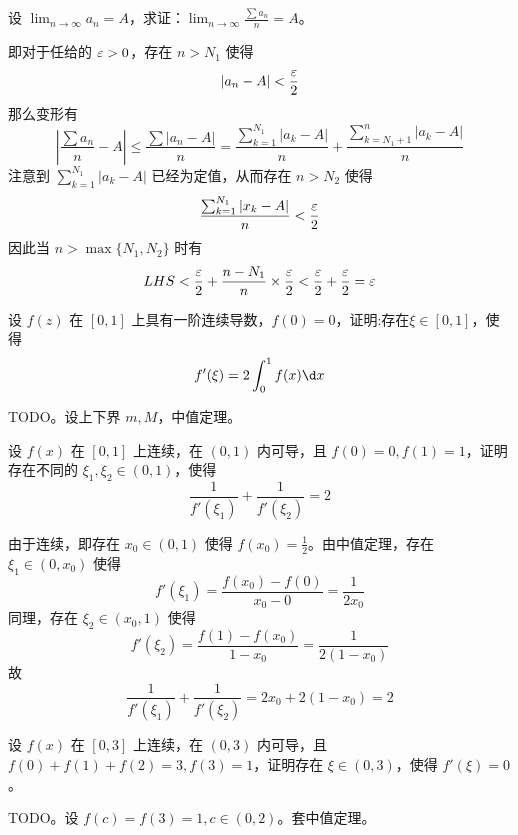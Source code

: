 \begin{problem}[000007]
设 $\displaystyle\lim_{n\to\infty}a_n=A$，求证：$\displaystyle\lim_{n\to\infty}\frac{\sum a_n}{n}=A$。
\end{problem}

\begin{solution}
	即对于任给的 $\varepsilon>0$，存在 $n>N_1$ 使得
	\[ |a_n-A|<\dfrac{\varepsilon}{2}\]
	那么变形有
	\[ \left|\frac{\sum a_n}{n}-A\right| \leqslant \frac{\sum |a_n-A|}{n} = \frac{\sum_{k=1}^{N_1} |a_k-A|}{n} + \frac{\sum_{k=N_1+1}^{n} |a_k-A|}{n}\]
	注意到 $\sum_{k=1}^{N_1} |a_k-A|$ 已经为定值，从而存在 $n>N_2$ 使得
	\[ \frac{\sum_{k=1}^{N_1}|x_k-A|}{n}<\frac{\varepsilon}{2}\]
	因此当 $n>\max\{N_1,N_2\}$ 时有
	\[ LHS < \frac{\varepsilon}{2}+\frac{n-N_1}{n}\times \frac{\varepsilon}{2} < \frac{\varepsilon}{2}+\frac{\varepsilon}{2} = \varepsilon \]
\end{solution}

\begin{problem}[000009]
设 $f(z)$ 在 $[0,1]$ 上具有一阶连续导数，$f(0) = 0$，证明:存在$\xi \in [0,1]$，使得
\[ f'(\xi) = 2\int_0^1f(x) \d x \]
\end{problem}

\begin{solution}
	TODO。设上下界 $m, M$，中值定理。
\end{solution}

\begin{problem}[000010]
设 $f(x)$ 在 $[0, 1]$ 上连续，在 $(0, 1)$ 内可导，且 $f(0) = 0, f(1) = 1$，证明存在不同的 $\xi_1, \xi_2 \in (0, 1)$，使得
\[ \frac{1}{f'(\xi_1)} + \frac{1}{f'(\xi_2)} = 2 \]
\end{problem}

\begin{solution}
	由于连续，即存在 $x_0 \in (0, 1)$ 使得 $f(x_0) = \frac{1}{2}$。由中值定理，存在 $\xi_1 \in (0, x_0)$ 使得
	\[ f'(\xi_1) = \frac{f(x_0) - f(0)}{x_0 - 0} = \frac{1}{2x_0}
	\]
	同理，存在 $\xi_2 \in (x_0, 1)$ 使得
	\[ f'(\xi_2) = \frac{f(1) - f(x_0)}{1 - x_0} = \frac{1}{2(1 -x_0)} \]
	故
	\[ \frac{1}{f'(\xi_1)} + \frac{1}{f'(\xi_2)} = 2x_0 + 2(1 - x_0) = 2 \]

\end{solution}

\begin{problem}[000011]
设 $f(x)$ 在 $[0, 3]$ 上连续，在 $(0, 3)$ 内可导，且 $f(0) + f(1) + f(2) = 3, f(3) = 1$，证明存在 $\xi \in (0, 3)$，使得 $f'(\xi) = 0$。
\end{problem}

\begin{solution}
	TODO。设 $f(c) = f(3) = 1, c \in (0, 2)$。套中值定理。
\end{solution}

